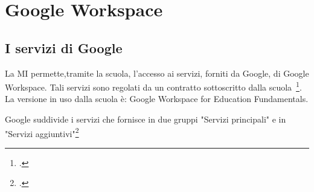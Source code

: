 \chapter{Google Workspace}
\section{I servizi di Google}
La MI permette,tramite la scuola, l'accesso ai servizi, forniti da \textenglish{Google}, di \textenglish{Google Workspace}. Tali servizi sono regolati da un contratto sottoscritto dalla scuola~\footcite{Google2020}. La versione in uso dalla scuola è:  \textenglish{Google Workspace for Education Fundamentals}.

\textenglish{Google} suddivide i servizi che fornisce in due gruppi "Servizi principali" e in "Servizi aggiuntivi"\footcite{Google2021a}


